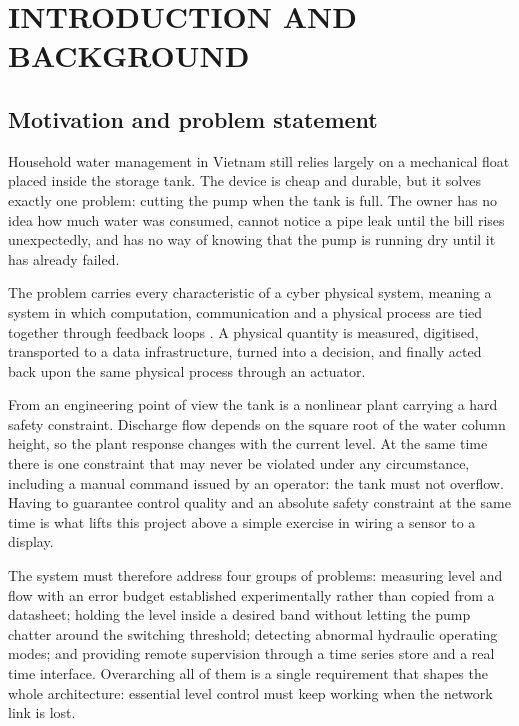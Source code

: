 \chapter{INTRODUCTION AND BACKGROUND}
\label{chap:intro}

\section{Motivation and problem statement}
\label{sec:o1-1}

Household water management in Vietnam still relies largely on a mechanical float placed inside the storage tank. The device is cheap and durable, but it solves exactly one problem: cutting the pump when the tank is full. The owner has no idea how much water was consumed, cannot notice a pipe leak until the bill rises unexpectedly, and has no way of knowing that the pump is running dry until it has already failed.

The problem carries every characteristic of a cyber physical system, meaning a system in which computation, communication and a physical process are tied together through feedback loops \cite{slide01}. A physical quantity is measured, digitised, transported to a data infrastructure, turned into a decision, and finally acted back upon the same physical process through an actuator.

From an engineering point of view the tank is a nonlinear plant carrying a hard safety constraint. Discharge flow depends on the square root of the water column height, so the plant response changes with the current level. At the same time there is one constraint that may never be violated under any circumstance, including a manual command issued by an operator: the tank must not overflow. Having to guarantee control quality and an absolute safety constraint at the same time is what lifts this project above a simple exercise in wiring a sensor to a display.

The system must therefore address four groups of problems: measuring level and flow with an error budget established experimentally rather than copied from a datasheet; holding the level inside a desired band without letting the pump chatter around the switching threshold; detecting abnormal hydraulic operating modes; and providing remote supervision through a time series store and a real time interface. Overarching all of them is a single requirement that shapes the whole architecture: essential level control must keep working when the network link is lost.

